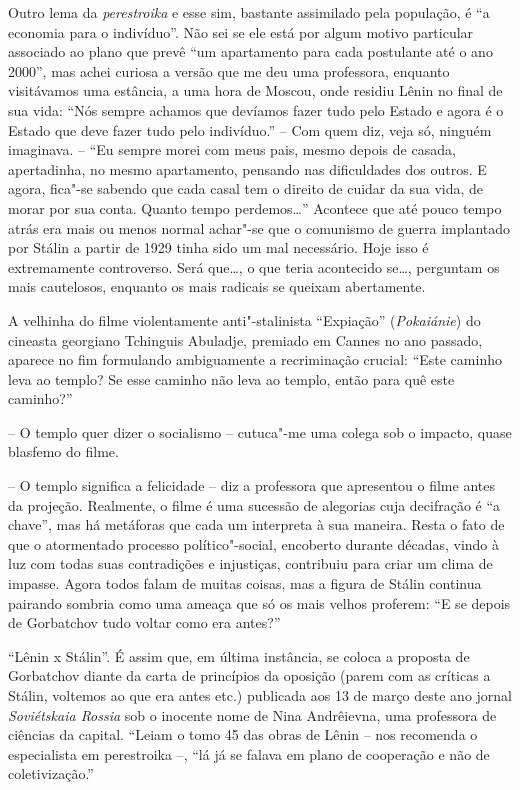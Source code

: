 Outro lema da \emph{perestroika} e esse sim, bastante assimilado pela
população, é ``a economia para o indivíduo''. Não sei se ele está por
algum motivo particular associado ao plano que prevê ``um apartamento
para cada postulante até o ano 2000'', mas achei curiosa a versão que me
deu uma professora, enquanto visitávamos uma estância, a uma hora de
Moscou, onde residiu Lênin no final de sua vida: ``Nós sempre achamos
que devíamos fazer tudo pelo Estado e agora é o Estado que deve fazer
tudo pelo indivíduo.'' -- Com quem diz, veja só, ninguém imaginava. --
``Eu sempre morei com meus pais, mesmo depois de casada, apertadinha, no
mesmo apartamento, pensando nas dificuldades dos outros. E agora,
fica"-se sabendo que cada casal tem o direito de cuidar da sua vida, de
morar por sua conta. Quanto tempo perdemos\ldots{}'' Acontece que até pouco
tempo atrás era mais ou menos normal achar"-se que o comunismo de guerra
implantado por Stálin a partir de 1929 tinha sido um mal necessário.
Hoje isso é extremamente controverso. Será que\ldots{}, o que teria
acontecido se\ldots{}, perguntam os mais cautelosos, enquanto os mais
radicais se queixam abertamente.

A velhinha do filme violentamente anti"-stalinista ``Expiação''
(\emph{Pokaiánie}) do cineasta georgiano Tchinguis Abuladje, premiado em
Cannes no ano passado, aparece no fim formulando ambiguamente a
recriminação crucial: ``Este caminho leva ao templo? Se esse caminho não
leva ao templo, então para quê este caminho?''

-- O templo quer dizer o socialismo -- cutuca"-me uma colega sob o
impacto, quase blasfemo do filme.

-- O templo significa a felicidade -- diz a professora que apresentou o
filme antes da projeção. Realmente, o filme é uma sucessão de alegorias
cuja decifração é ``a chave'', mas há metáforas que cada um interpreta à
sua maneira. Resta o fato de que o atormentado processo político"-social,
encoberto durante décadas, vindo à luz com todas suas contradições e
injustiças, contribuiu para criar um clima de impasse. Agora todos falam
de muitas coisas, mas a figura de Stálin continua pairando sombria como
uma ameaça que só os mais velhos proferem: ``E se depois de Gorbatchov
tudo voltar como era antes?''

``Lênin x Stálin''. É assim que, em última instância, se coloca a
proposta de Gorbatchov diante da carta de princípios da oposição (parem
com as críticas a Stálin, voltemos ao que era antes etc.) publicada aos
13 de março deste ano jornal \emph{Soviétskaia Rossia} sob o inocente
nome de Nina Andrêievna, uma professora de ciências da capital. ``Leiam
o tomo 45 das obras de Lênin -- nos recomenda o especialista em
perestroika --, ``lá já se falava em plano de cooperação e não de
coletivização.''

